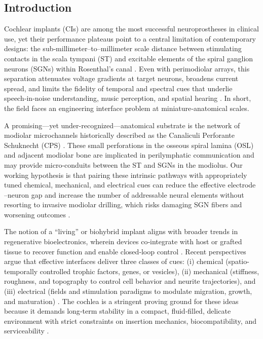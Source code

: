 \documentclass[referee,pdflatex, sn-vancouver-num]{sn-jnl}%
\theoremstyle{thmstyleone}%
\theoremstyle{thmstyletwo}%
\theoremstyle{thmstylethree}%
\DeclareRobustCommand{\textendash}{\ifmmode\text{-}\else\leavevmode\hbox{--}\fi}
\begin{document}
\subsection{Introduction}
\noindent
Cochlear implants (CIs) are among the most successful neuroprostheses in clinical use, yet their performance plateaus point to a central limitation of contemporary designs: the sub‑millimeter–to–millimeter scale distance between stimulating contacts in the scala tympani (ST) and excitable elements of the spiral ganglion neurons (SGNs) within Rosenthal's canal \cite{Vecchi2024}. Even with perimodiolar arrays, this separation attenuates voltage gradients at target neurons, broadens current spread, and limits the fidelity of temporal and spectral cues that underlie speech‑in‑noise understanding, music perception, and spatial hearing \cite{wilson2008,wilson2014}. In short, the field faces an engineering interface problem at miniature‑anatomical scales.

A promising—yet under-recognized—anatomical substrate is the network of modiolar microchannels historically described as the Canaliculi Perforante Schuknecht (CPS) \cite{Schuknecht1959}. These small perforations in the osseous spiral lamina (OSL) and adjacent modiolar bone are implicated in perilymphatic communication and may provide micro-conduits between the ST and SGNs in the modiolus. Our working hypothesis is that pairing these intrinsic pathways with appropriately tuned chemical, mechanical, and electrical cues can reduce the effective electrode \textendash neuron gap and increase the number of addressable neural elements without resorting to invasive modiolar drilling, which risks damaging SGN fibers and worsening outcomes \cite{Vecchi2024}.

The notion of a “living” or biohybrid implant aligns with broader trends in regenerative bioelectronics, wherein devices co‑integrate with host or grafted tissue to recover function and enable closed‑loop control \cite{Roemer2016}. Recent perspectives argue that effective interfaces deliver three classes of cues: (i) chemical (spatio-temporally controlled trophic factors, genes, or vesicles), (ii) mechanical (stiffness, roughness, and topography to control cell behavior and neurite trajectories), and (iii) electrical (fields and stimulation paradigms to modulate migration, growth, and maturation) \cite{CarnicerLombarte2024AdvMat}. The cochlea is a stringent proving ground for these ideas because it demands long‑term stability in a compact, fluid‑filled, delicate environment with strict constraints on insertion mechanics, biocompatibility, and serviceability \cite{Vecchi2024}.
\end{document}
